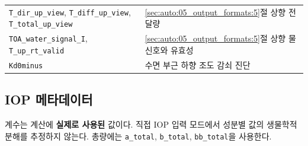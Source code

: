 {\begin{longtable}{@{}>{\raggedright\arraybackslash}p{}>{\raggedright\arraybackslash}p{}@{}}
\texttt{T\_\allowbreak{}dir\_\allowbreak{}up\_\allowbreak{}view}, \texttt{T\_\allowbreak{}diff\_\allowbreak{}up\_\allowbreak{}view}, \texttt{T\_\allowbreak{}total\_\allowbreak{}up\_\allowbreak{}view} & \ref{sec:auto:05_output_formats:5}절 상향 전달량 \\
\texttt{TOA\_\allowbreak{}water\_\allowbreak{}signal\_\allowbreak{}I}, \texttt{T\_\allowbreak{}up\_\allowbreak{}rt\_\allowbreak{}valid} & \ref{sec:auto:05_output_formats:5}절 상향 물 신호와 유효성 \\
\texttt{Kd0minus} & 수면 부근 하향 조도 감쇠 진단 \\
\end{longtable}
}

\subsection{IOP 메타데이터}
\label{sec:auto:05_output_formats:7.3}
계수는 계산에 \textbf{실제로 사용된} 값이다. 직접 IOP 입력 모드에서 성분별 값의 생물학적 분해를 추정하지 않는다. 총량에는 \texttt{a\_\allowbreak{}total}, \texttt{b\_\allowbreak{}total}, \texttt{bb\_\allowbreak{}total}을 사용한다.


